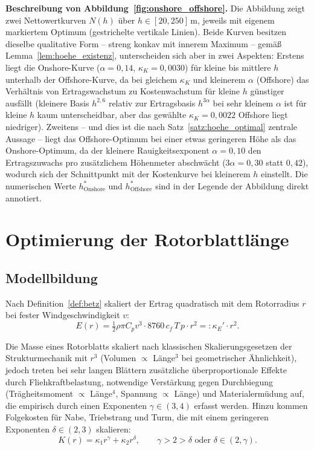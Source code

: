 ﻿\documentclass[a4paper,12pt]{article}
\theoremstyle{definition}
\begin{document}
\textbf{Beschreibung von Abbildung~\ref{fig:onshore_offshore}.}
Die Abbildung zeigt zwei Nettowertkurven $N(h)$ über $h\in[20,250]\,\mathrm{m}$, jeweils mit eigenem markiertem Optimum (gestrichelte vertikale Linien). Beide Kurven besitzen dieselbe qualitative Form -- streng konkav mit innerem Maximum -- gemäß Lemma~\ref{lem:hoehe_existenz}, unterscheiden sich aber in zwei Aspekten: Erstens liegt die Onshore-Kurve ($\alpha=0{,}14$, $\kappa_K=0{,}0030$) für kleine bis mittlere $h$ unterhalb der Offshore-Kurve, da bei gleichem $\kappa_K$ und kleinerem $\alpha$ (Offshore) das Verhältnis von Ertragswachstum zu Kostenwachstum für kleine $h$ günstiger ausfällt (kleinere Basis $h^{2{,}6}$ relativ zur Ertragsbasis $h^{3\alpha}$ bei sehr kleinem $\alpha$ ist für kleine $h$ kaum unterscheidbar, aber das gewählte $\kappa_K=0{,}0022$ Offshore liegt niedriger). Zweitens -- und dies ist die nach Satz~\ref{satz:hoehe_optimal} zentrale Aussage -- liegt das Offshore-Optimum bei einer etwas geringeren Höhe als das Onshore-Optimum, da der kleinere Rauigkeitsexponent $\alpha=0{,}10$ den Ertragszuwachs pro zusätzlichem Höhenmeter abschwächt ($3\alpha=0{,}30$ statt $0{,}42$), wodurch sich der Schnittpunkt mit der Kostenkurve bei kleinerem $h$ einstellt. Die numerischen Werte $h^*_{\mathrm{Onshore}}$ und $h^*_{\mathrm{Offshore}}$ sind in der Legende der Abbildung direkt annotiert.

\section{Optimierung der Rotorblattlänge}
\label{sec:blattlaenge}

\subsection{Modellbildung}

Nach Definition~\ref{def:betz} skaliert der Ertrag quadratisch mit dem Rotorradius $r$ bei fester Windgeschwindigkeit $v$:
\[
E(r) = \tfrac{1}{2}\rho\pi C_p v^3 \cdot 8760\, c_f\, T\, p \cdot r^2 =: \kappa_E' \cdot r^2.
\]

Die Masse eines Rotorblatts skaliert nach klassischen Skalierungsgesetzen der Strukturmechanik mit $r^3$ (Volumen $\propto$ Länge$^3$ bei geometrischer Ähnlichkeit), jedoch treten bei sehr langen Blättern zusätzliche überproportionale Effekte durch Fliehkraftbelastung, notwendige Verstärkung gegen Durchbiegung (Trägheitsmoment $\propto$ Länge$^4$, Spannung $\propto$ Länge) und Materialermüdung auf, die empirisch durch einen Exponenten $\gamma \in (3, 4)$ erfasst werden. Hinzu kommen Folgekosten für Nabe, Triebstrang und Turm, die mit einem geringeren Exponenten $\delta \in (2,3)$ skalieren:
\[
K(r) = \kappa_1 r^{\gamma} + \kappa_2 r^{\delta}, \qquad \gamma > 2 > \delta \text{ oder } \delta \in (2,\gamma).
\]
\end{document}
